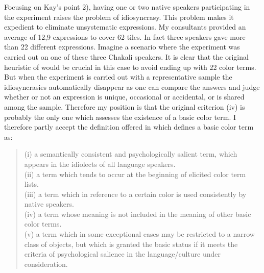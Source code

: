 Focusing  on Kay's point 2),  having one or two native speakers participating in
the
experiment  raises the problem of idiosyncrasy. This problem makes it expedient
to eliminate unsystematic expressions. My consultants provided an average of
12,9 expressions to cover 62 tiles. In fact three speakers
gave more than 22 different expressions. Imagine a scenario where the experiment
was carried out on one of these three Chakali speakers. It is clear that the
original 
heuristic of \cite{Berl69} would be crucial  in this case to avoid ending up 
with
22 color terms.  But when the experiment is carried out with a representative
sample the idiosyncrasies automatically disappear as one can compare the answers
and judge  whether or not an expression is unique, occasional or accidental, or
is shared among the sample. Therefore my position is that the original
criterion (iv) is probably  the only one which assesses the existence of a
basic color term. I therefore partly accept the definition offered in
\citet[30]{Uusk08} which defines a basic color term as:

\begin{quote}
(i) a semantically consistent and psychologically salient term, which appears
in
the idiolects of all language speakers. \\
(ii) a term which tends to occur at  the beginning
of elicited color term
lists.\\
(iii) a term which in reference to a certain color is used consistently by
native speakers.\\
(iv) a term whose  meaning is not included in the meaning of other basic
color terms.\\
 (v)  a term which in some exceptional cases may be restricted to a narrow class
of
objects, but which is granted the basic status if it meets the criteria of
psychological salience in the language/culture under consideration.\\
\end{quote}



